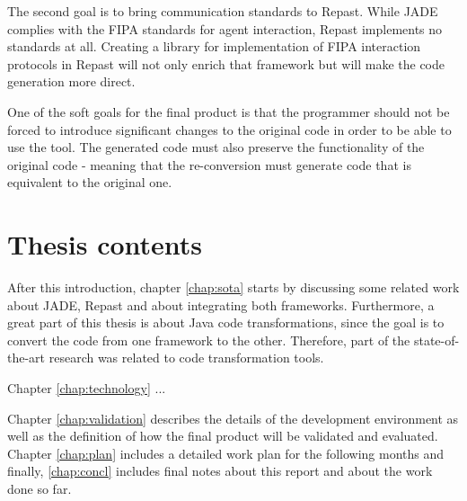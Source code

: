 The second goal is to bring communication standards to Repast. While JADE complies with the FIPA standards for agent interaction, Repast implements no standards at all. Creating a library for implementation of FIPA interaction
protocols in Repast will not only enrich that framework but will make the code
generation more direct.

One of the soft goals for the final product is that the programmer should not be forced to introduce significant changes to the original code in order to be able to use the tool. The generated code must also preserve the functionality of the original code - meaning that the re-conversion must generate code that is equivalent to the original one.
 

\section{Thesis contents} \label{sec:struct}

After this introduction, chapter \ref{chap:sota} starts by discussing some related work about JADE, Repast and about integrating both frameworks. Furthermore, a great part of this thesis is about Java code transformations, since the goal is to convert the code from one framework to the other.
Therefore, part of the state-of-the-art research was related to code
transformation tools.

Chapter \ref{chap:technology} ...

Chapter \ref{chap:validation} describes the details of the development environment as well as the definition of how the final product will be validated and evaluated. Chapter \ref{chap:plan} includes a detailed work plan for the following months
and finally, \ref{chap:concl} includes final notes about this report and about
the work done so far.
